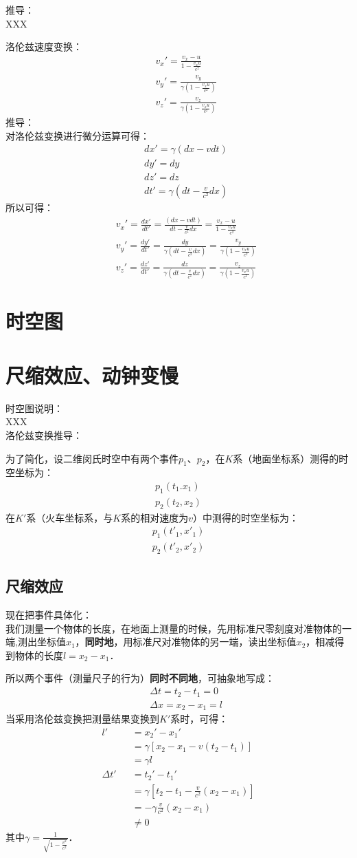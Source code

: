 \documentclass[11pt]{article}
\newcommand{\bea}{\setlength\arraycolsep{2pt} \begin{eqnarray}}
\newcommand{\eea}{\end{eqnarray}}
\numberwithin{equation}{section}
\begin{document}
\begin{CJK}{GBK}{song}
推导：\\

XXX

洛伦兹速度变换：
\bea
&&v_x'=\frac{v_x-u}{1-\frac{v_x u}{c^2}}\\
&&v_y'=\frac{v_y}{\gamma(1-\frac{v_x u}{c^2})}\\
&&v_z'=\frac{v_z}{\gamma(1-\frac{v_x u}{c^2})}
\eea
推导：\\
对洛伦兹变换进行微分运算可得：
\bea
&&dx'=\gamma(dx-v dt) \\
&&dy'=dy\\
&&dz'=dz\\
&&dt'=\gamma(dt-\frac{v}{c^2}dx)
\eea
所以可得：
\bea
&&v_x'=\frac{dx'}{dt'}=\frac{(dx-v dt)}{dt-\frac{v}{c^2}dx}=\frac{v_x-u}{1-\frac{v_x u}{c^2}} \\
&&v_y'=\frac{dy'}{dt'}=\frac{dy}{\gamma(dt-\frac{v}{c^2}dx)}=\frac{v_y}{\gamma(1-\frac{v_x u}{c^2})}\\
&&v_z'=\frac{dz'}{dt'}=\frac{dz}{\gamma(dt-\frac{v}{c^2}dx)}=\frac{v_z}{\gamma(1-\frac{v_x u}{c^2})}
\eea
\section{时空图}
\section{尺缩效应、动钟变慢}
时空图说明：\\
XXX\\
洛伦兹变换推导：


为了简化，设二维闵氏时空中有两个事件$p_1$、$p_2$，在$K$系（地面坐标系）测得的时空坐标为：
\bea
p_1(t_1.x_1)\\
p_2(t_2,x_2)
\eea
在$K'$系（火车坐标系，与$K$系的相对速度为$v$）中测得的时空坐标为：
\bea
p_1(t'_1,x'_1)\\
p_2(t'_2,x'_2)
\eea
\subsection{尺缩效应}
现在把事件具体化：\\
我们测量一个物体的长度，在地面上测量的时候，先用标准尺零刻度对准物体的一端,测出坐标值$x_1$，\textbf{同时地}，用标准尺对准物体的另一端，读出坐标值$x_2$，相减得到物体的长度$l=x_2-x_1$．

所以两个事件（测量尺子的行为）\textbf{同时不同地}，可抽象地写成：
\bea
&&\Delta t=t_2-t_1=0 \\
&&\Delta x =x_2-x_1=l
\eea
当采用洛伦兹变换把测量结果变换到$K'$系时，可得：
\bea
l'&&=x_2'-x_1' \\
&&=\gamma[x_2-x_1-v(t_2-t_1)]\\
&&=\gamma l \\
\Delta t'&&=t_2'-t_1' \\
&&=\gamma[t_2-t_1-\frac{v}{c^2}(x_2-x_1)]\\
&&=-\gamma\frac{v}{c^2}(x_2-x_1) \\
&&\not =0
\eea
其中$\gamma=\frac{1}{\sqrt{1-\frac{v^2}{c^2}}}$．


\end{CJK}
\end{document}
